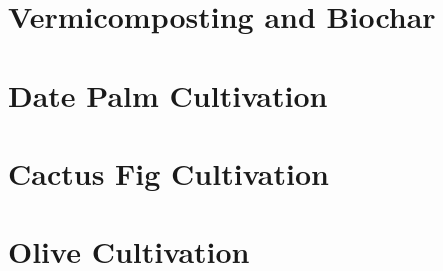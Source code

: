 \documentclass[12pt,a4paper]{report}
\begin{document}
\chapter{Vermicomposting and Biochar}









\chapter{Date Palm Cultivation}









\chapter{Cactus Fig Cultivation}









\chapter{Olive Cultivation}








\end{document}
